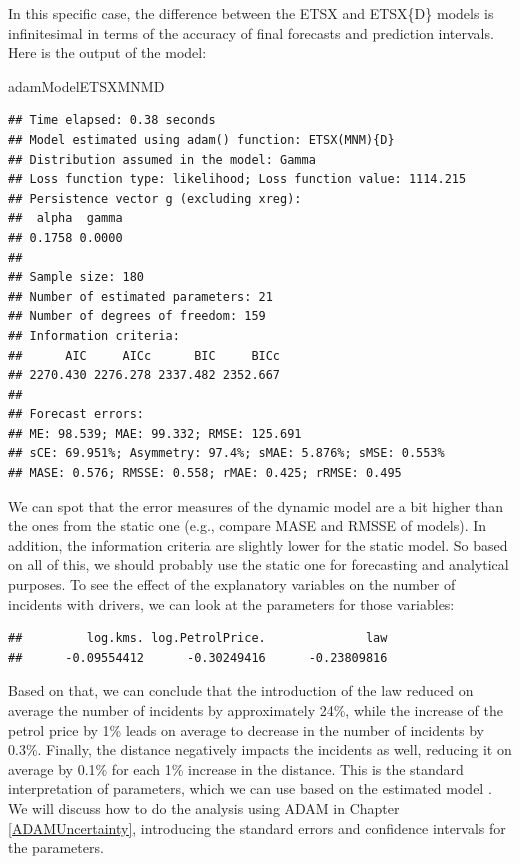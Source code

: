 \documentclass[
]{book}
\newenvironment{Shaded}{\begin{snugshade}}{\end{snugshade}}
\newcommand{\NormalTok}[1]{#1}
\newcommand{\SpecialCharTok}[1]{\textcolor[rgb]{0.00,0.00,0.00}{#1}}
\theoremstyle{definition}
\theoremstyle{definition}
\theoremstyle{definition}
\theoremstyle{definition}
\theoremstyle{remark}
\begin{document}
In this specific case, the difference between the ETSX and ETSX\{D\} models is infinitesimal in terms of the accuracy of final forecasts and prediction intervals. Here is the output of the model:

\begin{Shaded}
\begin{Highlighting}[]
\NormalTok{adamModelETSXMNMD}
\end{Highlighting}
\end{Shaded}

\begin{verbatim}
## Time elapsed: 0.38 seconds
## Model estimated using adam() function: ETSX(MNM){D}
## Distribution assumed in the model: Gamma
## Loss function type: likelihood; Loss function value: 1114.215
## Persistence vector g (excluding xreg):
##  alpha  gamma 
## 0.1758 0.0000 
## 
## Sample size: 180
## Number of estimated parameters: 21
## Number of degrees of freedom: 159
## Information criteria:
##      AIC     AICc      BIC     BICc 
## 2270.430 2276.278 2337.482 2352.667 
## 
## Forecast errors:
## ME: 98.539; MAE: 99.332; RMSE: 125.691
## sCE: 69.951%; Asymmetry: 97.4%; sMAE: 5.876%; sMSE: 0.553%
## MASE: 0.576; RMSSE: 0.558; rMAE: 0.425; rRMSE: 0.495
\end{verbatim}

We can spot that the error measures of the dynamic model are a bit higher than the ones from the static one (e.g., compare MASE and RMSSE of models). In addition, the information criteria are slightly lower for the static model. So based on all of this, we should probably use the static one for forecasting and analytical purposes. To see the effect of the explanatory variables on the number of incidents with drivers, we can look at the parameters for those variables:

\begin{Shaded}
\end{Shaded}

\begin{verbatim}
##         log.kms. log.PetrolPrice.              law 
##      -0.09554412      -0.30249416      -0.23809816
\end{verbatim}

Based on that, we can conclude that the introduction of the law reduced on average the number of incidents by approximately 24\%, while the increase of the petrol price by 1\% leads on average to decrease in the number of incidents by 0.3\%. Finally, the distance negatively impacts the incidents as well, reducing it on average by 0.1\% for each 1\% increase in the distance. This is the standard interpretation of parameters, which we can use based on the estimated model \citep[see, for example, discussion in Section 8.3 of][]{SvetunkovSBA}. We will discuss how to do the analysis using ADAM in Chapter \ref{ADAMUncertainty}, introducing the standard errors and confidence intervals for the parameters.
\end{document}
